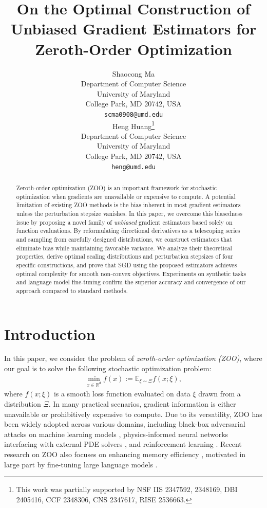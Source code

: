 \documentclass{article}
\title{On the Optimal Construction of Unbiased Gradient Estimators for Zeroth-Order Optimization}
\author{%
  Shaocong Ma \\
  Department of Computer Science\\
  University of Maryland\\
  College Park, MD 20742, USA \\
  \texttt{scma0908@umd.edu} \\
  \And
  Heng Huang\thanks{This work was partially supported by NSF IIS 2347592, 2348169, DBI 2405416, CCF 2348306, CNS 2347617, RISE 2536663.}\\
  Department of Computer Science\\
  University of Maryland\\
  College Park, MD 20742, USA \\
  \texttt{heng@umd.edu} \\
}
\newcommand{\EE}{\mathbb{E}}
\newcommand{\RR}{\mathbb{R}}
\theoremstyle{definition}
\theoremstyle{plain}
\theoremstyle{remark}
\begin{document}
\doparttoc %
\faketableofcontents %


\maketitle


\begin{abstract}
  Zeroth-order optimization (ZOO) is an important framework for stochastic optimization when gradients are unavailable or expensive to compute. A potential limitation of existing ZOO methods is the bias inherent in most gradient estimators unless the perturbation stepsize vanishes. In this paper, we overcome this biasedness issue by proposing a novel family of \textit{unbiased} gradient estimators based solely on function evaluations. By reformulating directional derivatives as a telescoping series and sampling from carefully designed distributions, we construct estimators that eliminate bias while maintaining favorable variance. We analyze their theoretical properties, derive optimal scaling distributions and perturbation stepsizes of four specific constructions, and prove that SGD using the proposed estimators achieves optimal complexity for smooth non-convex objectives. Experiments on synthetic tasks and language model fine-tuning confirm the superior accuracy and convergence of our approach compared to standard methods.
\end{abstract}

\section{Introduction}
In this paper, we consider the problem of \textit{zeroth-order optimization (ZOO)}, where our goal is to solve the following  stochastic optimization problem:
\begin{align}\label{eq:optimization-problem}
\min_{x \in \RR^d} f(x) := \EE_{\xi \sim \Xi} f(x;\xi),
\end{align}
where $f(x;\xi)$ is a smooth loss function evaluated on data  $\xi$ drawn from a distribution $\Xi$.  In many practical scenarios, gradient information is either unavailable or prohibitively expensive to compute. Due to its versatility, ZOO has been widely adopted across various domains, including black-box adversarial attacks on machine learning models \citep{chen2017zoo, kurakin2016adversarial, papernot2017practical, cai2021zeroth, zhao2020towards}, physics-informed neural networks interfacing with external PDE solvers \citep{shen2024memory, Ma2025}, and reinforcement learning \citep{choromanski2018structured, lei2022zeroth, suh2022differentiable}. Recent research on ZOO also focuses on enhancing memory efficiency \citep{cai2022one,cai2022zeroth,li2024addax,sugiura2025elasticzo}, motivated in large part by fine-tuning large language models \citep{malladi2023fine, zhang2024revisiting, gautam2024variance, tang2024private, wang2024simultaneous, wang2025zo2}. 
\end{document}
